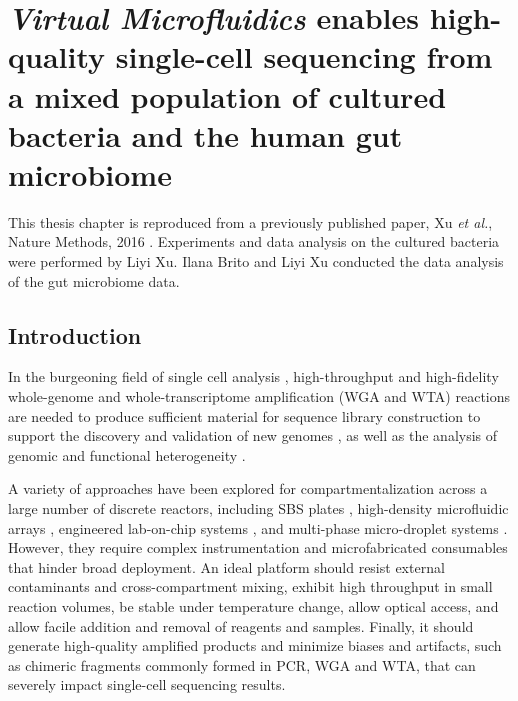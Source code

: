 \chapter{\textbf{\textit{Virtual Microfluidics}} enables high-quality single-cell sequencing from a mixed population of cultured bacteria and the human gut microbiome}

This thesis chapter is reproduced from a previously published paper, Xu \textit{et al.}, Nature Methods, 2016 \cite{Xu:2016wt}. Experiments and data analysis on the cultured bacteria were performed by Liyi Xu. Ilana Brito and Liyi Xu conducted the data analysis of the gut microbiome data.


\section{Introduction}
In the burgeoning field of single cell analysis \cite{Blainey:2013hn}, high-throughput and high-fidelity whole-genome \cite{Fu:2015gl,Zhang:2006hq,Raghunathan:2005fg} and whole-transcriptome amplification (WGA and WTA) reactions are needed to produce sufficient material for sequence library construction to support the discovery and validation of new genomes \cite{Marshall:2012jz,Pamp:2012cj,Hess:2011gu}, as well as the analysis of genomic and functional heterogeneity \cite{Wang:2012bb,Fu:2015gl,Pamp:2012cj}.

A variety of approaches have been explored for compartmentalization across a large number of discrete reactors, including SBS plates \cite{Zhang:2006hq}, high-density microfluidic arrays \cite{Love:2013hf}, engineered lab-on-chip systems \cite{Thorsen:2002dn,Landry:2013dh,deBourcy:2014ji,Marcy:2007ip}, and multi-phase micro-droplet systems \cite{Fu:2015gl,Thorsen:2001td,Hindson:2011fg,Morinishi:2015jx}. However, they require complex instrumentation and microfabricated consumables that hinder broad deployment. An ideal platform should resist external contaminants and cross-compartment mixing, exhibit high throughput in small reaction volumes, be stable under temperature change, allow optical access, and allow facile addition and removal of reagents and samples. Finally, it should generate high-quality amplified products and minimize biases and artifacts, such as chimeric fragments commonly formed in PCR, WGA and WTA, that can severely impact single-cell sequencing results. 

